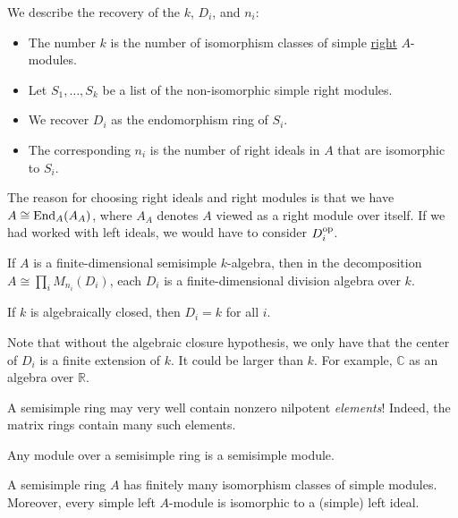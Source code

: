 \documentclass[12pt]{article}
\begin{document}
\begin{rem}
	We describe the recovery of the $k$, $D_{i}$, and $n_{i}$: 
	\begin{itemize}
		\item The number $k$ is the number of isomorphism classes of simple \underline{right} $A$-modules.
		\item Let $S_{1}, \ldots, S_{k}$ be a list of the non-isomorphic simple right modules.
		\item We recover $D_{i}$ as the endomorphism ring of $S_{i}$.
		\item The corresponding $n_{i}$ is the number of right ideals in $A$ that are isomorphic to $S_{i}$.
	\end{itemize}
	The reason for choosing right ideals and right modules is that 
	we have $A \cong \operatorname{End}_{A}(A_{A})$, where $A_{A}$ denotes $A$ viewed as a right module over itself. \newline
	If we had worked with left ideals, we would have to consider $D_{i}^{\operatorname{op}}$.
\end{rem}

\begin{thm}
	If $A$ is a finite-dimensional semisimple $k$-algebra, 
	then in the decomposition $A \cong \prod_{i} M_{n_{i}}(D_{i})$, 
	each $D_{i}$ is a finite-dimensional division algebra over $k$.

	If $k$ is algebraically closed, then $D_{i} = k$ for all $i$.
\end{thm}
Note that without the algebraic closure hypothesis, we only have that the center of $D_{i}$ is a finite extension of $k$. 
It could be larger than $k$. 
For example, $\mathbb{C}$ as an algebra over $\mathbb{R}$.

\begin{rem}
	A semisimple ring may very well contain nonzero nilpotent \emph{elements}! 
	Indeed, the matrix rings contain many such elements.
\end{rem}

\begin{thm} \label{thm:modules-over-semisimple-rings}
	Any module over a semisimple ring is a semisimple module.
\end{thm}

\begin{thm} \label{thm:semisimple-finitely-many-simples}
	A semisimple ring $A$ has finitely many isomorphism classes of simple modules. 
	Moreover, every simple left $A$-module is isomorphic to a (simple) left ideal.
\end{thm}
\end{document}
